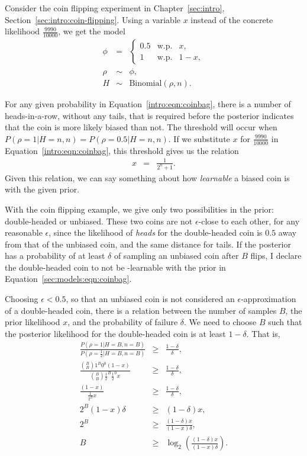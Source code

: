 \begin{example}

Consider the coin flipping experiment in Chapter~\ref{sec:intro}, Section~\ref{sec:intro:coin-flipping}. Using a variable $x$ instead of the concrete likelihood $\frac{9990}{10000}$, we get the model
\begin{eqnarray}
\label{sec:models:eqn:coinbag}
\phi &=& \left\{\begin{array}{lll}
0.5 & \mbox{w.p.} & x,\\
1 & \mbox{w.p.} & 1-x,
\end{array}\right.\\
\rho &\sim&\phi,\\
H &\sim& \mbox{Binomial}(\rho, n).
\end{eqnarray}

For any given probability in Equation~\ref{intro:eqn:coinbag}, there is a number of heads-in-a-row, without any tails, that is required before the posterior indicates that the coin is more likely biased than not. The threshold will occur when $P(\rho=1|H=n,n)=P(\rho=0.5|H=n,n)$. If we substitute $x$ for $\frac{9990}{10000}$ in Equation~\ref{intro:eqn:coinbag}, this threshold gives us the relation
\begin{eqnarray}
x &=& \frac{1}{2^n+1}.
\end{eqnarray}
Given this relation, we can say something about how \emph{learnable} a biased coin is with the given prior.


With the coin flipping example, we give only two possibilities in the prior: double-headed or unbiased. These two coins are not $\epsilon$-close to each other, for any reasonable $\epsilon$, since the likelihood of \emph{heads} for the double-headed coin is $0.5$ away from that of the unbiased coin, and the same distance for tails. If the posterior has a probability of at least $\delta$ of sampling an unbiased coin after $B$ flips, I declare the double-headed coin to not be \bed-learnable with the prior in Equation~\ref{sec:models:eqn:coinbag}.

Choosing $\epsilon<0.5$, so that an unbiased coin is not considered an $\epsilon$-approximation of a double-headed coin, there is a relation between the number of samples $B$, the prior likelihood $x$, and the probability of failure $\delta$. We need to choose $B$ such that the posterior likelihood for the double-headed coin is at least $1-\delta$. That is,
\begin{eqnarray}
\frac
 {P(\rho=1|H=B,n=B)}
 {P(\rho=\frac{1}{2}|H=B,n=B)}
&\geq&
\frac
 {1-\delta}
 {\delta},\\
\frac
 {{B \choose B}1^B0^0 (1-x)} 
 {{B \choose B}{\frac{1}{2}}^B{\frac{1}{2}}^0 x}
&\geq&
\frac
 {1-\delta}
 {\delta},\\
\frac
 {(1-x)} 
 {{\frac{1}{2^B}} x}
&\geq&
\frac
 {1-\delta}
 {\delta},\\
 2^B(1-x)\delta 
 &\geq&
 (1-\delta)x,\\
 2^B 
 &\geq&
\frac
 {(1-\delta)x}
 {(1-x)\delta},\\
%
B &\geq& \log_2\left(\frac
 {(1-\delta)x}
 {(1-x)\delta}
 \right).
\end{eqnarray}


\end{example}
